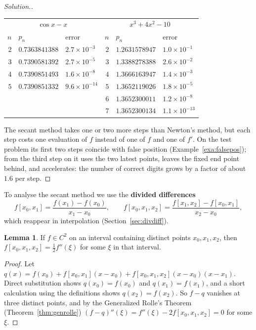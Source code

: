 \documentclass[11pt,a4paper]{article}
\numberwithin{equation}{section}
\theoremstyle{definition}
\newtheorem{lem}[thm]{Lemma}
\newenvironment{solution}
  {\renewcommand{\qedsymbol}{}\begin{proof}[\textit{Solution}.]}
  {\end{proof}}
\begin{document}
\begin{solution}
\begin{center}
\begin{tabular}{rllrll}
\hline
\multicolumn{3}{c}{$\cos x-x$} & \multicolumn{3}{c}{$x^3+4x^2-10$}\\
$n$ & $p_n$ & error & $n$ & $p_n$ & error\\
\hline
$2$ & $0.7363841388$ & $2.7\times10^{-3}$ & $2$ & $1.2631578947$ & $1.0\times10^{-1}$\\
$3$ & $0.7390581392$ & $2.7\times10^{-5}$ & $3$ & $1.3388278388$ & $2.6\times10^{-2}$\\
$4$ & $0.7390851493$ & $1.6\times10^{-8}$ & $4$ & $1.3666163947$ & $1.4\times10^{-3}$\\
$5$ & $0.7390851332$ & $9.6\times10^{-14}$ & $5$ & $1.3652119026$ & $1.8\times10^{-5}$\\
 & & & $6$ & $1.3652300011$ & $1.2\times10^{-8}$\\
 & & & $7$ & $1.3652300134$ & $1.1\times10^{-13}$\\
\hline
\end{tabular}
\end{center}
The secant method takes one or two more steps than Newton's method, but each step costs one evaluation of $f$ instead of one of $f$ and
one of $f'$. On the test problem its first two steps coincide with false position (Example~\ref{exa:falsepos}); from the third step on it
uses the two latest points, leaves the fixed end point behind, and accelerates: the number of correct digits grows by a factor of about
$1.6$ per step.
\end{solution}

To analyse the secant method we use the \textbf{divided differences}
$$f[x_0,x_1] = \frac{f(x_1)-f(x_0)}{x_1-x_0},\qquad f[x_0,x_1,x_2] = \frac{f[x_1,x_2]-f[x_0,x_1]}{x_2-x_0},$$
which reappear in interpolation (Section~\ref{sec:divdiff}).

\begin{lem}
\label{lem:dd2}
If $f\in C^2$ on an interval containing distinct points $x_0,x_1,x_2$, then $f[x_0,x_1,x_2] = \frac12f''(\xi)$ for some $\xi$ in that
interval.
\end{lem}

\begin{proof}
Let $q(x) = f(x_0)+f[x_0,x_1](x-x_0)+f[x_0,x_1,x_2](x-x_0)(x-x_1)$. Direct substitution shows $q(x_0) = f(x_0)$ and $q(x_1) = f(x_1)$, and
a short calculation using the definitions shows $q(x_2) = f(x_2)$. So $f-q$ vanishes at three distinct points, and by the Generalized
Rolle's Theorem (Theorem~\ref{thm:genrolle}) $(f-q)''(\xi) = f''(\xi)-2f[x_0,x_1,x_2] = 0$ for some $\xi$.
\end{proof}
\end{document}
